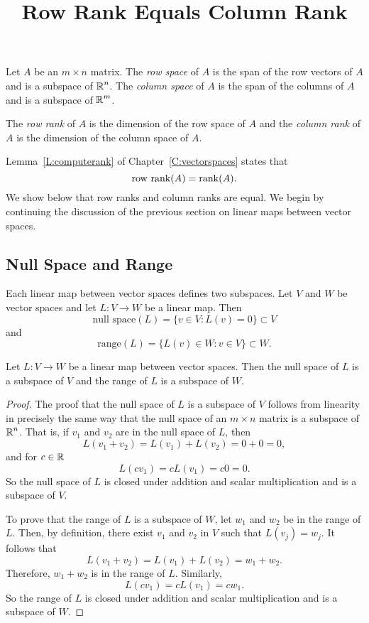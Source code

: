 \documentclass{ximera}
\title{Row Rank Equals Column Rank}
\begin{document}
\begin{abstract}
\end{abstract}
\maketitle

 \label{S:5.8}

Let $A$ be an $m\times n$ matrix.  The {\em row space\/}
 of $A$ is the span of the row vectors of $A$
and is a subspace of $\mbox{$\Bbb{R}$}^n$.  The {\em column space\/}
 of $A$ is the span of the columns of $A$
and is a subspace of $\mbox{$\Bbb{R}$}^m$.
\begin{definition} 
The {\em row rank\/} of $A$ is the dimension of the
row space of $A$ and the {\em column rank\/} of $A$ is the
dimension of the column space of $A$.
\end{definition}   
Lemma~\ref{L:computerank} of Chapter~\ref{C:vectorspaces} states that
\[
\mbox{row rank}(A) = {\rm rank}(A).
\]
We show below that row ranks and column ranks are equal.  We
begin by continuing the discussion of the previous section on linear maps
between vector spaces.

\subsection*{Null Space and Range}

Each linear map between vector spaces defines two subspaces.  Let $V$ and $W$ 
be vector spaces and let $L:V\to W$ be a linear map.  Then
\[
\mbox{null space}(L) = \{v\in V: L(v)=0\} \subset V
\]
 and 
\[
\mbox{range}(L) = \{L(v)\in W: v\in V \} \subset W.
\]

\begin{lemma} \label{L:nsr}
Let $L:V\to W$ be a linear map between vector spaces.  Then the null space of
$L$ is a subspace of $V$ and the range of $L$ is a subspace of $W$.
\end{lemma}

\begin{proof}  The proof that the null space of $L$ is a subspace of $V$ follows
from linearity in precisely the same way that the null space of an
$m\times n$ matrix is a subspace of $\mbox{$\Bbb{R}$}^n$.  That is, if $v_1$ and $v_2$ are
in the null space of $L$, then
\[
L(v_1+v_2) = L(v_1) + L(v_2) = 0 + 0 = 0,
\]
and for $c\in\mbox{$\Bbb{R}$}$
\[
L(cv_1) = cL(v_1) = c0 = 0.
\]
So the null space of $L$ is closed under addition and scalar multiplication
and is a subspace of $V$.

To prove that the range of $L$ is a subspace of $W$, let $w_1$ and $w_2$ be
in the range of $L$.  Then, by definition, there exist $v_1$ and $v_2$ in $V$
such that $L(v_j)=w_j$.  It follows that
\[
L(v_1+v_2) = L(v_1) + L(v_2) = w_1 + w_2.
\]
Therefore, $w_1+w_2$ is in the range of $L$.  Similarly,
\[
L(cv_1) = cL(v_1) = cw_1.
\]
So the range of $L$ is closed under addition and scalar multiplication and is
a subspace of $W$.  \end{proof}
\end{document}
